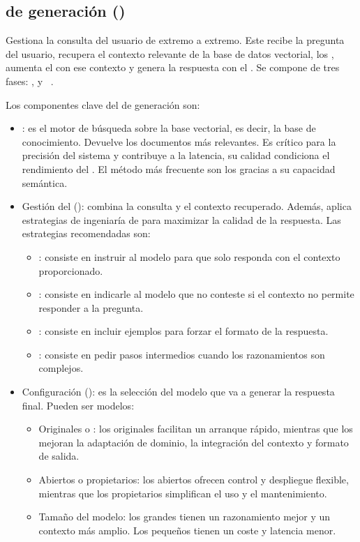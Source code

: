 \subsection{ de generación ()}
Gestiona la consulta del usuario de extremo a extremo. Este  recibe la pregunta del usuario, recupera el contexto relevante de la base de datos vectorial, los , aumenta el  con ese contexto y genera la respuesta con el . Se compone de tres fases: ,  y ~\cite{book:RAG_SimpleGuide}. 

Los componentes clave del  de generación son:
\begin{itemize}
\tightlist
	\item {}: es el motor de búsqueda sobre la base vectorial, es decir, la base de conocimiento. Devuelve los documentos más relevantes. Es crítico para la precisión del sistema y contribuye a la latencia, su calidad condiciona el rendimiento del . El método más frecuente son los  gracias a su capacidad semántica.
	\item Gestión del  (): combina la consulta y el contexto recuperado. Además, aplica estrategias de ingeniaría de  para maximizar la calidad de la respuesta. Las estrategias recomendadas son:
	\begin{itemize}
	\tightlist
		\item {}: consiste en instruir al modelo para que solo responda con el contexto proporcionado.
		\item {}: consiste en indicarle al modelo que no conteste si el contexto no permite responder a la pregunta.
		\item {}: consiste en incluir ejemplos para forzar el formato de la respuesta.
		\item {}: consiste en pedir pasos intermedios cuando los razonamientos son complejos.
	\end{itemize}
	\item Configuración  (): es la selección del modelo que va a generar la respuesta final. Pueden ser modelos:
	\begin{itemize}
	\tightlist
		\item Originales o : los originales facilitan un arranque rápido, mientras que los  mejoran la adaptación de dominio, la integración del contexto y formato de salida.
		\item Abiertos o propietarios: los abiertos ofrecen control y despliegue flexible, mientras que los propietarios simplifican el uso y el mantenimiento.
		\item Tamaño del modelo: los grandes tienen un razonamiento mejor y un contexto más amplio. Los pequeños tienen un coste y latencia menor.
	\end{itemize}
\end{itemize} 

